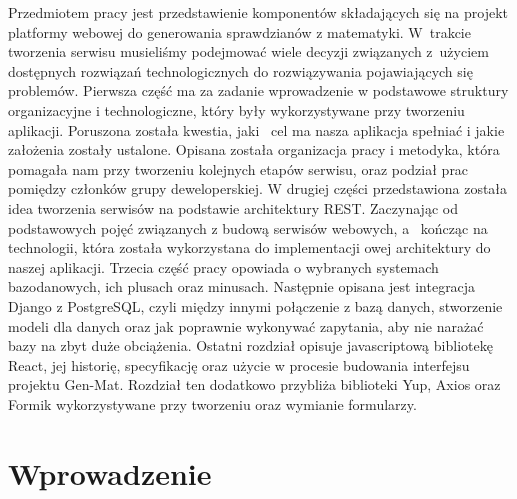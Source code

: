 \documentclass[oneside,polski,logo,indent]{amuthesis}
\date{Poznań, \today{} r.}
\begin{document}
\maketitle
\makestatement

\begin{streszczenie}
Przedmiotem pracy jest przedstawienie komponentów składających się na projekt platformy webowej do generowania sprawdzianów z matematyki. W~trakcie tworzenia serwisu musieliśmy podejmować wiele decyzji związanych z~użyciem dostępnych rozwiązań technologicznych do rozwiązywania pojawiających się problemów.
Pierwsza część ma za zadanie wprowadzenie w podstawowe struktury organizacyjne i technologiczne, który były wykorzystywane przy tworzeniu aplikacji. Poruszona została kwestia, jaki~ cel ma nasza aplikacja spełniać i jakie założenia zostały ustalone. Opisana została organizacja pracy i metodyka, która pomagała nam przy tworzeniu kolejnych etapów serwisu, oraz podział prac pomiędzy członków grupy deweloperskiej.
W drugiej części przedstawiona została idea tworzenia serwisów na podstawie architektury REST. Zaczynając od podstawowych pojęć związanych z budową serwisów webowych, a~ kończąc na technologii, która została wykorzystana do implementacji owej architektury do naszej aplikacji.
Trzecia część pracy opowiada o wybranych systemach bazodanowych, ich plusach oraz minusach. Następnie opisana jest integracja Django z PostgreSQL, czyli między innymi połączenie z bazą danych, stworzenie modeli dla danych oraz jak poprawnie wykonywać zapytania, aby nie narażać bazy na zbyt duże obciążenia.
Ostatni rozdział opisuje javascriptową bibliotekę React, jej historię, specyfikację oraz użycie w procesie budowania interfejsu projektu Gen-Mat. Rozdział ten dodatkowo przybliża biblioteki Yup, Axios oraz Formik wykorzystywane przy tworzeniu oraz wymianie formularzy.
\end{streszczenie}


\tableofcontents


\chapter{Wprowadzenie}
\end{document}
